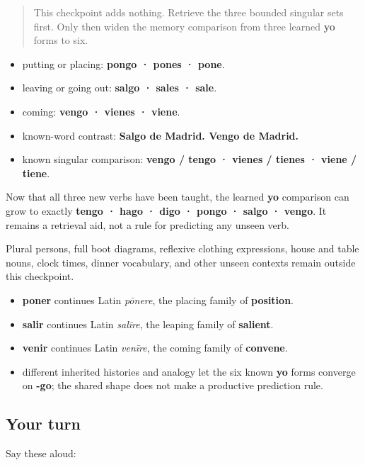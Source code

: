 \begin{quote}
This checkpoint adds nothing. Retrieve the three bounded singular sets first. Only then widen the memory comparison from three learned \textbf{yo} forms to six.
\end{quote}

\begin{grammarlens}[title={Grammar Lens: the complete frame for this chapter}]
\begin{itemize}
\raggedright
  \item putting or placing: \textbf{pongo · pones · pone}.
  \item leaving or going out: \textbf{salgo · sales · sale}.
  \item coming: \textbf{vengo · vienes · viene}.
  \item known-word contrast: \textbf{Salgo de Madrid. Vengo de Madrid.}
  \item known singular comparison: \textbf{vengo / tengo · vienes / tienes · viene / tiene}.
\end{itemize}

Now that all three new verbs have been taught, the learned \textbf{yo} comparison can grow to exactly \textbf{tengo · hago · digo · pongo · salgo · vengo}. It remains a retrieval aid, not a rule for predicting any unseen verb.

Plural persons, full boot diagrams, reflexive clothing expressions, house and table nouns, clock times, dinner vocabulary, and other unseen contexts remain outside this checkpoint.
\end{grammarlens}

\begin{cousinweb}
\begin{itemize}
\raggedright
  \item \textbf{poner} continues Latin \emph{pōnere}, the placing family of \textbf{position}.
  \item \textbf{salir} continues Latin \emph{salīre}, the leaping family of \textbf{salient}.
  \item \textbf{venir} continues Latin \emph{venīre}, the coming family of \textbf{convene}.
  \item different inherited histories and analogy let the six known \textbf{yo} forms converge on \textbf{-go}; the shared shape does not make a productive prediction rule.
\end{itemize}
\end{cousinweb}

\subsection*{Your turn}
Say these aloud:

